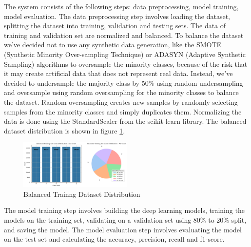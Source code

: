 The system consists of the following steps: data preprocessing, model training, model evaluation. The data preprocessing step involves loading the dataset, splitting the dataset into training, validation and testing sets. The data of training and validation set are normalized and balanced. To balance the dataset we've decided not to use any synthetic data generation, like the SMOTE (Synthetic Minority Over-sampling Technique) or ADASYN (Adaptive Synthetic Sampling) algorithms to oversample the minority classes, because of the risk that it may create artificial data that does not represent real data. Instead, we've decided to undersample the majority class by 50\% using random undersampling and oversample using random oversampling for the minority classes to balance the dataset. Random oversampling creates new samples by randomly selecting samples from the minority classes and simply duplicates them.
Normalizing the data is done using the StandardScaler from the scikit-learn library.
The balanced dataset distribution is shown in figure \ref{fig:balanced_trainset_distribution}. 

\begin{figure}[htbp]
    \centering
    \includegraphics[width=0.5\textwidth]{images/BalancedDatasetTrainingDistribution.png}
    \caption{Balanced Trainng Dataset Distribution}
    \label{fig:balanced_trainset_distribution}
\end{figure}

The model training step involves building the deep learning models, training the models on the training set, validating on a validation set using 80\% to 20\% split, and saving the model. The model evaluation step involves evaluating the model on the test set and calculating the accuracy, precision, recall and f1-score.

